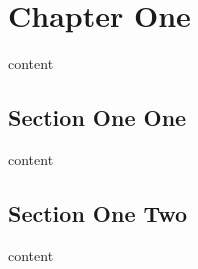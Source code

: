 \documentclass{book}
\begin{document}
\chapter{Chapter One}

content

\section{Section One One}

content

\section{Section One Two}

content
\end{document}
